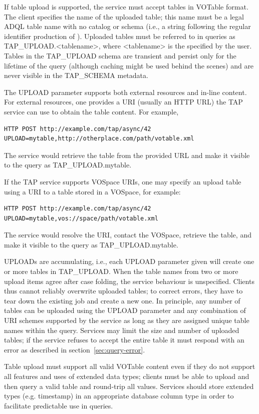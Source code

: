 \documentclass[11pt,letter]{ivoa}
\begin{document}
If table upload is supported, the service must accept tables in VOTable format. 
The client specifies the name of the uploaded table; this name must be a legal 
ADQL table name with no catalog or schema (i.e., a string following the 
regular identifier production of \citep{std:ADQL}). Uploaded tables must be 
referred 
to in queries as TAP\_UPLOAD.<tablename>, where <tablename> is the 
specified by the user. Tables in the TAP\_UPLOAD schema are 
transient and persist only for the lifetime of the query (although caching might 
be used behind the scenes) and are never visible in the 
TAP\_SCHEMA metadata.

The \citep{std:DALI} UPLOAD parameter supports both external resources and 
in-line 
content. For external resources, one provides a URI (usually an HTTP URL) the 
TAP service can use to obtain the table content. For example,
\begin{verbatim}
HTTP POST http://example.com/tap/async/42
UPLOAD=mytable,http://otherplace.com/path/votable.xml
\end{verbatim}
The service would retrieve the table from the provided URL and 
make it visible to the query as TAP\_UPLOAD.mytable.

If the TAP service supports VOSpace URIs, one may 
specify an upload table using a URI to a table stored in a VOSpace, for example:
\begin{verbatim}
HTTP POST http://example.com/tap/async/42
UPLOAD=mytable,vos://space/path/votable.xml
\end{verbatim}
The service would resolve the URI, contact the VOSpace, retrieve the table, and 
make it visible to the query as TAP\_UPLOAD.mytable.

UPLOADs are accumulating, i.e., each UPLOAD parameter given will create one or 
more tables in TAP\_UPLOAD. When the table names from two or more 
upload items agree after case folding, the service behaviour is unspecified. 
Clients thus cannot reliably overwrite uploaded tables; to correct errors, they 
have to tear down the existing job and create a new one. In principle, any 
number of tables can be uploaded using the UPLOAD parameter and any combination 
of URI schemes supported by the service as long as they are assigned unique 
table names within the query. Services may limit the size and number of 
uploaded tables; if the service refuses to accept the entire table it must 
respond with an error as described in section~\ref{sec:query-error}.

Table upload must support all valid VOTable content even if they do not support 
all features and uses of extended data types; clients must be able to upload and then
query a valid table and round-trip all values. Services should store extended types (e.g. 
timestamp) in an appropriate database column type in order to facilitate predictable use 
in queries.
\end{document}
